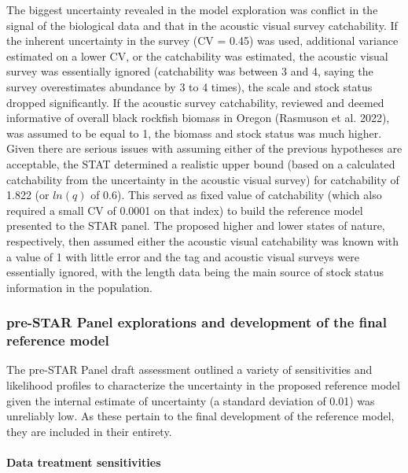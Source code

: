 \documentclass[11pt,
  english,
  letterpaper,
]{article}
\begin{document}
The biggest uncertainty revealed in the model exploration was conflict in the signal of the biological data and that in the acoustic visual survey catchability. If the inherent uncertainty in the survey (CV = 0.45) was used, additional variance estimated on a lower CV, or the catchability was estimated, the acoustic visual survey was essentially ignored (catchability was between 3 and 4, saying the survey overestimates abundance by 3 to 4 times), the scale and stock status dropped significantly. If the acoustic survey catchability, reviewed and deemed informative of overall black rockfish biomass in Oregon (Rasmuson et al. 2022), was assumed to be equal to 1, the biomass and stock status was much higher. Given there are serious issues with assuming either of the previous hypotheses are acceptable, the STAT determined a realistic upper bound (based on a calculated catchability from the uncertainty in the acoustic visual survey) for catchability of 1.822 (or \(ln(q)\) of 0.6). This served as fixed value of catchability (which also required a small CV of 0.0001 on that index) to build the reference model presented to the STAR panel. The proposed higher and lower states of nature, respectively, then assumed either the acoustic visual catchability was known with a value of 1 with little error and the tag and acoustic visual surveys were essentially ignored, with the length data being the main source of stock status information in the population.

\hypertarget{pre-star-panel-explorations-and-development-of-the-final-reference-model}{%
\subsubsection{pre-STAR Panel explorations and development of the final reference model}\label{pre-star-panel-explorations-and-development-of-the-final-reference-model}}

The pre-STAR Panel draft assessment outlined a variety of sensitivities and likelihood profiles to characterize the uncertainty in the proposed reference model given the internal estimate of uncertainty (a standard deviation of 0.01) was unreliably low. As these pertain to the final development of the reference model, they are included in their entirety.

\hypertarget{data-treatment-sensitivities}{%
\paragraph{Data treatment sensitivities}\label{data-treatment-sensitivities}}
\end{document}
